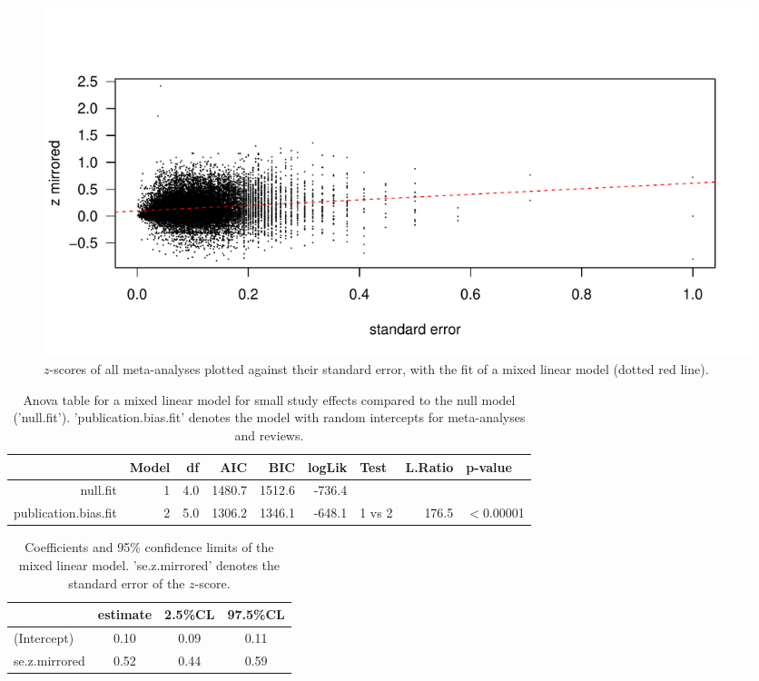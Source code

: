\documentclass[11pt,a4paper,twoside]{book}\usepackage[]{graphicx}\usepackage[]{color}
\newenvironment{knitrout}{}{} %
\begin{document}
\begin{figure}
\begin{knitrout}
\color{fgcolor}

{\centering \includegraphics[width=\textwidth-3cm]{figure/ch03_figunnamed-chunk-28-1} 

}



\end{knitrout}
\caption{$z$-scores of all meta-analyses plotted against their standard error, with the fit of a mixed linear model (dotted red line).}
\label{fig:smds}
\end{figure}

\begin{table}[ht]
\centering
\begingroup\scriptsize
\begin{tabular}{rrrrrrlrl}
  \hline
 & Model & df & AIC & BIC & logLik & Test & L.Ratio & p-value \\ 
  \hline
null.fit &  1 & 4.0 & 1480.7 & 1512.6 & -736.4 &  &  &  \\ 
  publication.bias.fit &  2 & 5.0 & 1306.2 & 1346.1 & -648.1 & 1 vs 2 & 176.5 & $<$0.00001 \\ 
   \hline
\end{tabular}
\endgroup
\caption{Anova table for a mixed linear model for small study effects compared to the null model ('null.fit'). 'publication.bias.fit' denotes the model with random intercepts for meta-analyses and reviews.} 
\label{anova.small.study}
\end{table}


\begin{table}[ht]
\centering
\begingroup\scriptsize
\begin{tabular}{lccc}
  \hline
 & estimate & 2.5\%CL & 97.5\%CL \\ 
  \hline
(Intercept) & 0.10 & 0.09 & 0.11 \\ 
  se.z.mirrored & 0.52 & 0.44 & 0.59 \\ 
   \hline
\end{tabular}
\endgroup
\caption{Coefficients and 95\% confidence limits of the mixed linear model. 'se.z.mirrored' denotes the standard error of the $z$-score.} 
\label{coefficients.small.study}
\end{table}
\end{document}
